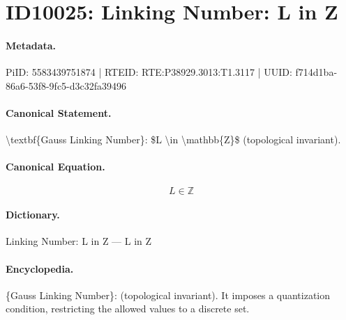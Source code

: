 \section*{ID10025: Linking Number: L in Z}
\paragraph{Metadata.}
PiID: 5583439751874 | RTEID: RTE:P38929.3013:T1.3117 | UUID: f714d1ba-86a6-53f8-9fc5-d3c32fa39496

\paragraph{Canonical Statement.}
\textbackslash{}textbf\{Gauss Linking Number\}: \$L \textbackslash{}in \textbackslash{}mathbb\{Z\}\$ (topological invariant).

\paragraph{Canonical Equation.}
\[
L \in \mathbb{Z}
\]

\paragraph{Dictionary.}
Linking Number: L in Z — L in Z

\paragraph{Encyclopedia.}
\{Gauss Linking Number\}: (topological invariant). It imposes a quantization condition, restricting the allowed values to a discrete set.
